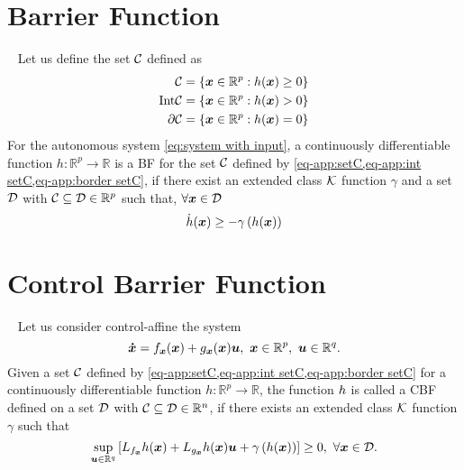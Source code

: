 \section{Barrier Function}
\begin{definition}\label{def:BF}~\cite{ames2017tac,xu2015ifac}
	Let us define the set ${\cal C}$ defined as 
	\begin{align}
		\label{eq-app:setC}	{\cal C} &= \left\{\bm{x}\in \mathbb{R}^p: h(\bm{x})\geq0\right\} \\
		\label{eq-app:int setC}		\mathrm{Int}{\cal C} &= \left\{\bm{x}\in \mathbb{R}^p: h(\bm{x})>0\right\} \\
		\label{eq-app:border setC}		\partial{\cal C} &= \left\{\bm{x}\in \mathbb{R}^p: h(\bm{x})=0\right\}
	\end{align}
	For the autonomous system \cref{eq:system with input}, a continuously differentiable function $h:\mathbb{R}^p\rightarrow\mathbb{R}$ is a BF for the set ${\cal C}$ defined by \cref{eq-app:setC,eq-app:int setC,eq-app:border setC}, if there exist an extended class ${\cal K}$ function $\gamma$ and a set ${\cal D}$ with ${\cal C}\subseteq{\cal D}\in \mathbb{R}^p$ such that, $\forall\bm{x}\in{\cal D}$
	\begin{equation}\label{eq-app:BF}
		\dot{h}(\bm{x})\geq-\gamma\left(h(\bm{x})\right)
	\end{equation}
\end{definition}
\section{Control Barrier Function}
\begin{definition}\label{def:CBF}~\cite{ames2017tac,xu2015ifac}
	Let us consider control-affine the system
	\begin{equation}
		\bm{\dot{x}} = f_{\bm{x}}(\bm{x}) + g_{\bm{x}}(\bm{x})\bm{u}, \ \bm{x}\inR^p, \ \bm{u}\inR^q.
	\end{equation}
	Given a set ${\cal C}$ defined by \cref{eq-app:setC,eq-app:int setC,eq-app:border setC}  for a continuously differentiable function $h:\mathbb{R}^p\rightarrow\mathbb{R}$, the function $h$ is called a CBF defined on a set ${\cal D}$ with ${\cal C}\subseteq{\cal D}\in \mathbb{R}^n$, if there exists an extended class ${\cal K}$ function $\gamma$ such that 
	\begin{equation}\label{eq-app:CBF}
		\underset{\bm{u}\in \mathbb{R}^q}{\sup}\left[L_{f_{\bm{x}}}h(\bm{x}) + L_{g_{\bm{x}}}h(\bm{x})\bm{u} + \gamma\left(h(\bm{x})\right)\right] \geq0, \ \forall\bm{x}\in{\cal D}.
	\end{equation}
\end{definition}
